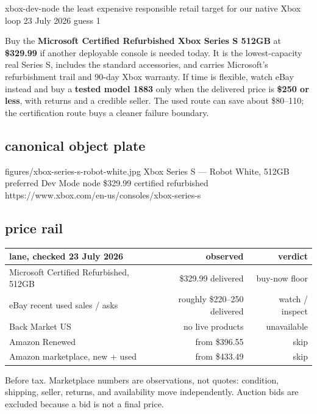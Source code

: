 \documentclass[10pt,letterpaper]{article}
\begin{document}
\gearGuessTitle
  {xbox-dev-node}
  {the least expensive responsible retail target for our native Xbox loop}
  {23 July 2026}
  {guess 1}

\begin{bestguess}
Buy the \textbf{Microsoft Certified Refurbished Xbox Series S 512GB} at
\textbf{\$329.99} if another deployable console is needed today. It is the
lowest-capacity real Series S, includes the standard accessories, and carries
Microsoft's refurbishment trail and 90-day Xbox warranty. If time is flexible,
watch eBay instead and buy a \textbf{tested model 1883} only when the delivered
price is \textbf{\$250 or less}, with returns and a credible seller. The used
route can save about \$80--110; the certification route buys a cleaner failure
boundary.
\end{bestguess}

\subsection{canonical object plate}
\begin{center}
\gearproduct
  {figures/xbox-series-s-robot-white.jpg}
  {Xbox Series S — Robot White, 512GB}
  {preferred Dev Mode node}
  {\$329.99 certified refurbished}
  {https://www.xbox.com/en-us/consoles/xbox-series-s}
  {\buyXboxSeriesSRefurb}
\end{center}

\gearaffiliatedisclosure

\subsection{price rail}

\begin{tabularx}{\linewidth}{@{}Y R R@{}}
\toprule
\textbf{lane, checked 23 July 2026} & \textbf{observed} & \textbf{verdict} \\
\midrule
Microsoft Certified Refurbished, 512GB & \$329.99 delivered & buy-now floor \\
eBay recent used sales / asks & roughly \$220--250 delivered & watch / inspect \\
Back Market US & no live products & unavailable \\
Amazon Renewed & from \$396.55 & skip \\
Amazon marketplace, new + used & from \$433.49 & skip \\
\bottomrule
\end{tabularx}
{\footnotesize\color{acgray}Before tax. Marketplace numbers are observations,
not quotes: condition, shipping, seller, returns, and availability move
independently. Auction bids are excluded because a bid is not a final price.}
\end{document}

